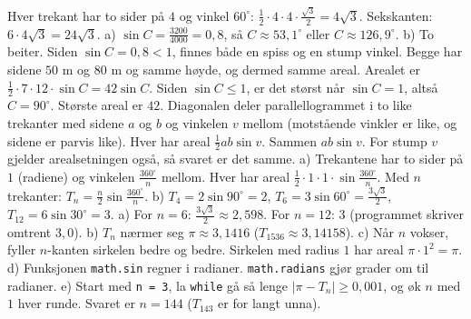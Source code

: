  Hver trekant har to sider på $4$ og vinkel $60^\circ$: $\frac12 \cdot 4 \cdot 4 \cdot \frac{\sqrt3}{2} = 4\sqrt3$. Sekskanten: $6 \cdot 4\sqrt3 = 24\sqrt3$.
 a) $\sin C = \frac{3200}{4000} = 0{,}8$, så $C \approx 53{,}1^\circ$ eller $C \approx 126{,}9^\circ$. b) To beiter. Siden $\sin C = 0{,}8 < 1$, finnes både en spiss og en stump vinkel. Begge har sidene $50$ m og $80$ m og samme høyde, og dermed samme areal.
 Arealet er $\frac12 \cdot 7 \cdot 12 \cdot \sin C = 42\sin C$. Siden $\sin C \le 1$, er det størst når $\sin C = 1$, altså $C = 90^\circ$. Største areal er $42$.
 Diagonalen deler parallellogrammet i to like trekanter med sidene $a$ og $b$ og vinkelen $v$ mellom (motstående vinkler er like, og sidene er parvis like). Hver har areal $\frac12 ab\sin v$. Sammen $ab\sin v$. For stump $v$ gjelder arealsetningen også, så svaret er det samme.
 a) Trekantene har to sider på $1$ (radiene) og vinkelen $\frac{360^\circ}{n}$ mellom. Hver har areal $\frac12 \cdot 1 \cdot 1 \cdot \sin\frac{360^\circ}{n}$. Med $n$ trekanter: $T_n = \frac n2\sin\frac{360^\circ}{n}$.
b) $T_4 = 2\sin 90^\circ = 2$, $T_6 = 3\sin 60^\circ = \frac{3\sqrt3}{2}$, $T_{12} = 6\sin 30^\circ = 3$.
 a) For $n = 6$: $\frac{3\sqrt3}{2} \approx 2{,}598$. For $n = 12$: $3$ (programmet skriver omtrent $3{,}0$). b) $T_n$ nærmer seg $\pi \approx 3{,}1416$ ($T_{1536} \approx 3{,}14158$).
c) Når $n$ vokser, fyller $n$-kanten sirkelen bedre og bedre. Sirkelen med radius $1$ har areal $\pi \cdot 1^2 = \pi$.
d) Funksjonen \lstinline[style=laereverk,numbers=none,frame=none]|math.sin| regner i radianer. \lstinline[style=laereverk,numbers=none,frame=none]|math.radians| gjør grader om til radianer.
e) Start med \lstinline[style=laereverk,numbers=none,frame=none]|n = 3|, la \lstinline[style=laereverk,numbers=none,frame=none]|while| gå så lenge $|\pi - T_n| \ge 0{,}001$, og øk $n$ med $1$ hver runde. Svaret er $n = 144$ ($T_{143}$ er for langt unna).
